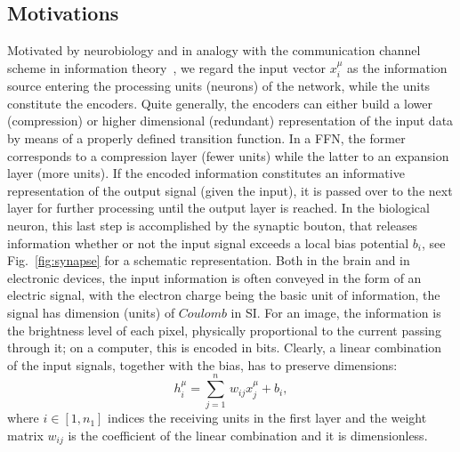 \documentclass[5p]{elsarticle}
\begin{document}
\subsection{Motivations} \label{sub:mot}
%
 Motivated by neurobiology and in analogy with the communication channel scheme in information theory~\cite{mckay, jaynes}, we regard the input vector $x^{\mu}_i$ as the information source entering the processing units (neurons) of the network, while the units constitute the encoders. Quite generally, the encoders can either build a lower (compression) or higher dimensional (redundant) representation of the input data by means of a properly defined transition function. In a FFN, the former corresponds to a compression layer (fewer units) while the latter to an expansion layer (more units). If the encoded information constitutes an informative representation of the output signal (given the input), it is passed  over to the next layer for further processing until the output layer is reached. In the biological neuron, this last step is accomplished by the synaptic bouton, that releases information whether or not the input signal exceeds a local bias potential $b_i$, see Fig.~\eqref{fig:synapse} for a schematic representation. Both in the brain and in electronic devices, the input information is often conveyed in the form of an electric signal, with the electron charge being the basic unit of information, the signal has dimension (units) of $Coulomb$ in SI. For an image, the information is the brightness level of each pixel, physically proportional to the current passing through it; on a computer, this is encoded in bits. Clearly, a linear combination of the input signals, together with the bias, has to preserve dimensions:
%
\begin{equation} \label{eq:lincomb}
h^{\mu}_i = \sum_{j=1}^{n} \, w_{ij} x^{\mu}_j + b_i,
\end{equation}
%
where $i \in [1, n_1]$ indices the receiving units in the first layer and the weight matrix $ w_{ij}$ is the coefficient of the linear combination and it is dimensionless.
\end{document}
